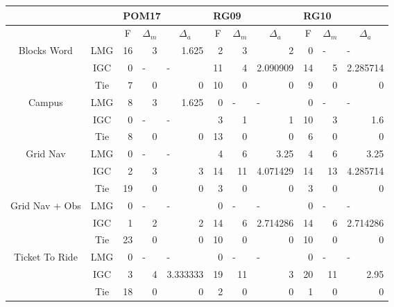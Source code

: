 \documentclass{article}
\begin{document}
\begin{table}[htbp]
\begin{tabular}{|c|c|r|r|r|r|r|r|r|r|r|}
\hline
&&\multicolumn{3}{|l|}{POM17}&\multicolumn{3}{|l|}{RG09}&\multicolumn{3}{|l|}{RG10} \\ \hline
&\multicolumn{1}{|l|}{} & \multicolumn{1}{c|}{F} & \multicolumn{1}{c|}{$\Delta_m$} & \multicolumn{1}{c|}{$\Delta_a$} & \multicolumn{1}{c|}{F} & \multicolumn{1}{c|}{$\Delta_m$} & \multicolumn{1}{c|}{$\Delta_a$} & \multicolumn{1}{c|}{F} & \multicolumn{1}{c|}{$\Delta_m$} & \multicolumn{1}{c|}{$\Delta_a$} \\ \hline
\multirow{3}{*}{Blocks Word} & LMG & 16 & 3 & 1.625 & 2 & 3 & 2 & 0 & \multicolumn{1}{l|}{-} & \multicolumn{1}{l|}{-} \\
&IGC & 0 & \multicolumn{1}{l|}{-} & \multicolumn{1}{l|}{-} & 11 & 4 & 2.090909 & 14 & 5 & 2.285714 \\
&Tie & 7 & 0 & 0 & 10 & 0 & 0 & 9 & 0 & 0 \\ \hline
\multirow{3}{*}{Campus} & LMG & 8 & 3 & 1.625 & 0 & \multicolumn{1}{l|}{-} & \multicolumn{1}{l|}{-} & 0 & \multicolumn{1}{l|}{-} & \multicolumn{1}{l|}{-} \\
&IGC & 0 & \multicolumn{1}{l|}{-} & \multicolumn{1}{l|}{-} & 3 & 1 & 1 & 10 & 3 & 1.6 \\
&Tie & 8 & 0 & 0 & 13 & 0 & 0 & 6 & 0 & 0 \\ \hline
\multirow{3}{*}{Grid Nav} & LMG & 0 & \multicolumn{1}{l|}{-} & \multicolumn{1}{l|}{-} & 4 & 6 & 3.25 & 4 & 6 & 3.25 \\
&IGC & 2 & 3 & 3 & 14 & 11 & 4.071429 & 14 & 13 & 4.285714 \\
&Tie & 19 & 0 & 0 & 3 & 0 & 0 & 3 & 0 & 0 \\ \hline
\multirow{3}{*}{Grid Nav + Obs} & LMG & 0 & \multicolumn{1}{l|}{-} & \multicolumn{1}{l|}{-} & 0 & \multicolumn{1}{l|}{-} & \multicolumn{1}{l|}{-} & 0 & \multicolumn{1}{l|}{-} & \multicolumn{1}{l|}{-} \\
&IGC & 1 & 2 & 2 & 14 & 6 & 2.714286 & 14 & 6 & 2.714286 \\
&Tie & 23 & 0 & 0 & 10 & 0 & 0 & 10 & 0 & 0 \\ \hline
\multirow{3}{*}{Ticket To Ride} & LMG & 0 & \multicolumn{1}{l|}{-} & \multicolumn{1}{l|}{-} & 0 & \multicolumn{1}{l|}{-} & \multicolumn{1}{l|}{-} & 0 & \multicolumn{1}{l|}{-} & \multicolumn{1}{l|}{-} \\
&IGC & 3 & 4 & 3.333333 & 19 & 11 & 3 & 20 & 11 & 2.95 \\
&Tie & 18 & 0 & 0 & 2 & 0 & 0 & 1 & 0 & 0 \\ \hline

\end{tabular}
\end{table}
\end{document}
